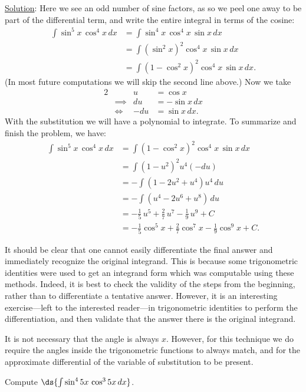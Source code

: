 \underline{Solution}: Here we see an odd number of sine factors,
as so we peel one away to be part of the differential term,
and write the entire integral in terms of the cosine:
\begin{align*}
\int\sin^5x\,\cos^4x\,dx&=\int\sin^4x\,\cos^4x\,\sin x\,dx\\
                      &=\int\left(\sin^2x\right)^2\cos^4x\,\sin x\,dx\\
                      &=\int\left(1-\cos^2x\right)^2\cos^4x\,\sin x\,dx.
\end{align*}
(In most future computations we will skip the second line above.)
Now we take
\begin{alignat*}{2}
&&u&=\cos x\\
&\implies& du&=-\sin x\,dx\\
&\iff&    -du&=\sin x\,dx.
\end{alignat*}
With the substitution we will have a polynomial to integrate.
To summarize and finish the problem, we have:
\begin{align*}
\int\sin^5x\,\cos^4x\,dx&=\int\left(1-\cos^2x\right)^2\cos^4x\,\sin x\,dx\\
      &=\int\left(1-u^2\right)^2u^4(-du)\\
      &=-\int\left(1-2u^2+u^4\right)u^4\,du\\
      &=-\int\left(u^4-2u^6+u^8\right)\,du\\
      &=-\frac15\,u^5+\frac27\,u^7-\frac19\,u^9+C\\
      &=-\frac15\cos^5x+\frac27\cos^7x-\frac19\cos^9x+C.
\end{align*}
\eex

It should be clear that one cannot easily differentiate the final
answer and immediately recognize the original integrand.  This is because
some trigonometric identities were used to get an integrand form
which was computable using these methods.  Indeed, it is best
to check the validity of the steps from the beginning, rather
than to differentiate a tentative answer.  However, it is an
interesting exercise---left to the interested reader---in 
trigonometric identities to 
perform the differentiation, and then validate that the
answer there is the original integrand.


It is not necessary that the angle is always $x$.
However, for this technique we do require the angles inside
the trigonometric functions to always match, and for the
approximate differential of the variable of substitution to be present.

\bex Compute $\ds{\int\sin^45x\,\cos^35x\,dx}$.

